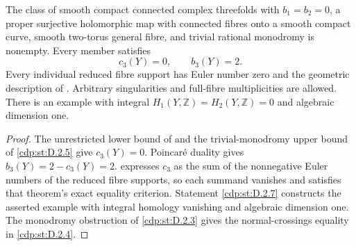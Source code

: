 \begin{proposition}\hypertarget{tag-01G9}{}\label{cdp:st:D.2.2}

The class of smooth compact connected complex threefolds with $b_1=b_2=0$,
a proper surjective holomorphic map with connected fibres onto a smooth compact curve,
smooth two-torus general fibre, and trivial rational monodromy is nonempty. Every member satisfies
\[
                   c_3(Y)=0,\qquad b_3(Y)=2.
\]
Every individual reduced fibre support has Euler number zero and
the geometric description of . Arbitrary singularities and
full-fibre multiplicities are allowed. There is an example with
integral $H_1(Y,\mathbb Z)=H_2(Y,\mathbb Z)=0$ and
algebraic dimension one.
\end{proposition}


\begin{proof}
The unrestricted lower bound of  and the
trivial-monodromy upper bound of \ref{cdp:st:D.2.5} give $c_3(Y)=0$.
Poincar\'e duality gives $b_3(Y)=2-c_3(Y)=2$.
 expresses $c_3$ as the sum of the nonnegative
Euler numbers of the reduced fibre supports, so each summand
vanishes and satisfies that theorem's exact equality criterion.
Statement \ref{cdp:st:D.2.7} constructs the asserted example with integral
homology vanishing and algebraic dimension one. The monodromy obstruction of \ref{cdp:st:D.2.3} gives the normal-crossings equality in \ref{cdp:st:D.2.4}.

\end{proof}